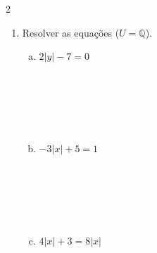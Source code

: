\documentclass[a4paper,14pt]{article}
\begin{document}
\begin{multicols}{2}
\begin{enumerate}
			\begin{enumerate}[a)]
				\item $|x| = \frac{4}{3}$ \\\\\\\\\\\\
				\item $|x| = 4$ \\\\\\\\\\\\
				\item $|x| = \frac{-1}{5}$ \\\\\\\\\\\\
				\item $|x| = \frac{3}{8}$ \\\\\\\\\\\\
				\item $|y| = 0$ \\\\\\\\\\\\
			\end{enumerate}
			\item Resolver as equações ($U = \mathbb{Q}$).
			\begin{enumerate}[a)]
				\item $2|y| - 7 = 0$ \\\\\\\\\\\\
				\item $-3|x| + 5 = 1$ \\\\\\\\\\\\
				\item $4|x| + 3 = 8|x|$ \\\\\\\\\\\\

\end{enumerate}
\end{enumerate}
\end{multicols}
\end{document}
